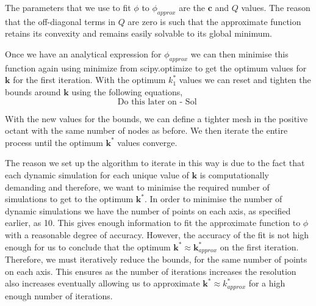 \documentclass[conference]{IEEEtran}
\theoremstyle{definition}
\begin{document}
\noindent The parameters that we use to fit $\phi$ to $\phi_{approx}$ are the $\mathbf{c}$ and $Q$ values. The reason that the off-diagonal terms in $Q$ are zero is such that the approximate function retains its convexity and remains easily solvable to its global minimum. 

\noindent Once we have an analytical expression for $\phi_{approx}$ we can then minimise this function again using minimize from scipy.optimize to get the optimum values for $\mathbf{k}$  for the first iteration. With the optimum $k_1^*$ values we can reset and tighten the bounds around $\mathbf{k}$ using the following equations,
\begin{equation}
    \textrm{Do this later on - Sol }
\end{equation} 

\noindent With the new values for the bounds, we can define a tighter mesh in the positive octant with the same number of nodes as before. We then iterate the entire process until the optimum $\mathbf{k}^*$ values converge. 

\noindent The reason we set up the algorithm to iterate in this way is due to the fact that each dynamic simulation for each unique value of $\mathbf{k}$ is computationally demanding and therefore, we want to minimise the required number of simulations to get to the optimum $\mathbf{k}^*$. In order to minimise the number of dynamic simulations we have the number of points on each axis, as specified earlier, as 10. This gives enough information to fit the approximate function to $\phi$ with a reasonable degree of accuracy. However, the accuracy of the fit is not high enough for us to conclude that the optimum $\mathbf{k}^* \approx \mathbf{k}_{approx}^*$ on the first iteration. Therefore, we must iteratively reduce the bounds, for the same number of points on each axis. This ensures as the number of iterations increases the resolution also increases eventually allowing us to approximate $\mathbf{k}^* \approx k_{approx}^*$ for a high enough number of iterations.
\end{document}
